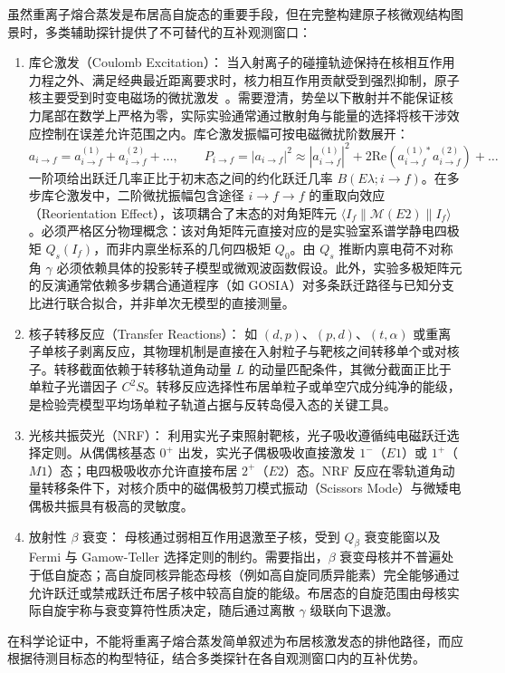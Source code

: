 虽然重离子熔合蒸发是布居高自旋态的重要手段，但在完整构建原子核微观结构图景时，多类辅助探针提供了不可替代的互补观测窗口：
\begin{enumerate}
\item 库仑激发（Coulomb Excitation）：
当入射离子的碰撞轨迹保持在核相互作用力程之外、满足经典最近距离要求时，核力相互作用贡献受到强烈抑制，原子核主要受到时变电磁场的微扰激发~\cite{book-bertulani-nuclear-reactions}。需要澄清，势垒以下散射并不能保证核力尾部在数学上严格为零，实际实验通常通过散射角与能量的选择将核干涉效应控制在误差允许范围之内。库仑激发振幅可按电磁微扰阶数展开：
\begin{equation}\label{eq:5-1-coulex-amp}
a_{i \to f} = a_{i \to f}^{(1)} + a_{i \to f}^{(2)} + \dots, \qquad P_{i \to f} = |a_{i \to f}|^2 \approx |a_{i \to f}^{(1)}|^2 + 2\mathrm{Re}\left(a_{i \to f}^{(1)*} a_{i \to f}^{(2)}\right) + \dots
\end{equation}
一阶项给出跃迁几率正比于初末态之间的约化跃迁几率 $B(E\lambda; i \to f)$。在多步库仑激发中，二阶微扰振幅包含途径 $i \to f \to f$ 的重取向效应（Reorientation Effect），该项耦合了末态的对角矩阵元 $\langle I_f \| \mathcal{M}(E2) \| I_f \rangle$。必须严格区分物理概念：该对角矩阵元直接对应的是实验室系谱学静电四极矩 $Q_s(I_f)$，而非内禀坐标系的几何四极矩 $Q_0$。由 $Q_s$ 推断内禀电荷不对称角 $\gamma$ 必须依赖具体的投影转子模型或微观波函数假设。此外，实验多极矩阵元的反演通常依赖多步耦合通道程序（如 GOSIA）对多条跃迁路径与已知分支比进行联合拟合，并非单次无模型的直接测量。
\item 核子转移反应（Transfer Reactions）：
如 $(d, p)$、$(p, d)$、$(t, \alpha)$ 或重离子单核子剥离反应，其物理机制是直接在入射粒子与靶核之间转移单个或对核子。转移截面依赖于转移轨道角动量 $L$ 的动量匹配条件，其微分截面正比于单粒子光谱因子 $C^2 S$。转移反应选择性布居单粒子或单空穴成分纯净的能级，是检验壳模型平均场单粒子轨道占据与反转岛侵入态的关键工具。
\item 光核共振荧光（NRF）：
利用实光子束照射靶核，光子吸收遵循纯电磁跃迁选择定则。从偶偶核基态 $0^+$ 出发，实光子偶极吸收直接激发 $1^-$（$E1$）或 $1^+$（$M1$）态；电四极吸收亦允许直接布居 $2^+$（$E2$）态。NRF 反应在零轨道角动量转移条件下，对核介质中的磁偶极剪刀模式振动（Scissors Mode）与微矮电偶极共振具有极高的灵敏度。
\item 放射性 $\beta$ 衰变：
母核通过弱相互作用退激至子核，受到 $Q_\beta$ 衰变能窗以及 Fermi 与 Gamow-Teller 选择定则的制约。需要指出，$\beta$ 衰变母核并不普遍处于低自旋态；高自旋同核异能态母核（例如高自旋同质异能素）完全能够通过允许跃迁或禁戒跃迁布居子核中较高自旋的能级。布居态的自旋范围由母核实际自旋宇称与衰变算符性质决定，随后通过离散 $\gamma$ 级联向下退激。
\end{enumerate}
在科学论证中，不能将重离子熔合蒸发简单叙述为布居核激发态的排他路径，而应根据待测目标态的构型特征，结合多类探针在各自观测窗口内的互补优势。

